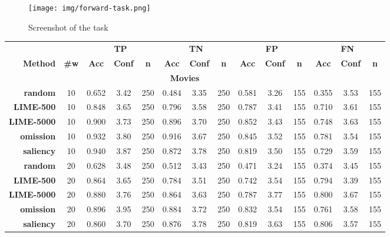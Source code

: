 \documentclass[11pt,a4paper]{article}
\begin{document}
\begin{figure}[h!]
    \centering
     \texttt{[image: img/forward-task.png]} 
       \caption{Screenshot of the task}
        \label{fig:forward_task}
\end{figure}




\begin{table*}[h!]
\center
\small
\begin{tabular}{rc|ccc|ccc|ccc|ccc}
\toprule 
 & &\multicolumn{3}{c}{\textbf{TP}} &  \multicolumn{3}{c}{\textbf{TN}} &  \multicolumn{3}{c}{\textbf{FP}} &  \multicolumn{3}{c}{\textbf{FN}} \\ 
\textbf{Method} & \textbf{\#w} & \textbf{Acc} & \textbf{Conf} & \textbf{n} &  \textbf{Acc} & \textbf{Conf} & \textbf{n} &   \textbf{Acc} & \textbf{Conf} & \textbf{n}&   \textbf{Acc} & \textbf{Conf} & \textbf{n}\\ 

\midrule 
\multicolumn{13}{c}{\textbf{Movies}}\\
\midrule 
\textbf{random}&10&0.652 & 3.42 & 250 & 0.484 & 3.35 & 250 & 0.581 & 3.26 & 155 & 0.355 & 3.53 & 155\\
\textbf{LIME-500}&10&0.848 & 3.65 & 250 & 0.796 & 3.58 & 250 & 0.787 & 3.41 & 155 & 0.710 & 3.61 & 155  \\
\textbf{LIME-5000}&10&0.900 & 3.73 & 250 & 0.896 & 3.70 & 250 & 0.852 & 3.43 & 155 & 0.748 & 3.63 & 155  \\
\textbf{omission}&10&0.932 & 3.80 & 250 & 0.916 & 3.67 & 250 & 0.845 & 3.52 & 155 & 0.781 & 3.54 & 155  \\
\textbf{saliency}&10&0.940 & 3.87 & 250 & 0.872 & 3.78 & 250 & 0.819 & 3.50 & 155 & 0.729 & 3.59 & 155  \\
\textbf{random}&20&0.628 & 3.48 & 250 & 0.512 & 3.43 & 250 & 0.471 & 3.24 & 155 & 0.374 & 3.45 & 155  \\
\textbf{LIME-500}&20&0.864 & 3.65 & 250 & 0.784 & 3.51 & 250 & 0.742 & 3.54 & 155 & 0.794 & 3.39 & 155  \\
\textbf{LIME-5000}&20&0.880 & 3.76 & 250 & 0.864 & 3.63 & 250 & 0.787 & 3.77 & 155 & 0.800 & 3.67 & 155  \\
\textbf{omission}&20&0.896 & 3.95 & 250 & 0.884 & 3.72 & 250 & 0.832 & 3.54 & 155 & 0.761 & 3.58 & 155  \\

\textbf{saliency}&20&0.860 & 3.70 & 250 & 0.876 & 3.78 & 250 & 0.819 & 3.63 & 155 & 0.806 & 3.57 & 155  \\


\end{tabular}
\end{table*}
\end{document}
